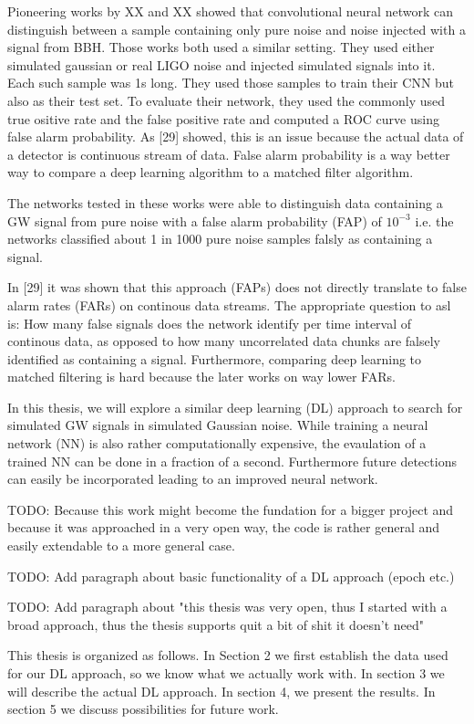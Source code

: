 Pioneering works by XX and XX showed that convolutional neural network can
distinguish between a sample containing only pure noise and noise injected
with a signal from BBH. Those works both used a similar setting. They used either
simulated gaussian or real LIGO noise and injected simulated signals into it.
Each such sample was 1s long. They used those samples to train their CNN but
also as their test set. To evaluate their network, they used the commonly used
true ositive rate and the false positive rate and computed a ROC curve using
false alarm probability. As [29] showed, this is an issue because the actual
data of a detector is continuous stream of data. False alarm probability is a
way better way to compare a deep learning algorithm to a matched filter
algorithm.

The networks tested in these works were able to distinguish
data containing a GW signal from pure noise with a false alarm probability (FAP)
of $10^{-3}$ i.e. the networks classified about 1 in 1000 pure noise samples
falsly as containing a signal.

In [29] it was shown that this approach (FAPs) does not directly translate to
false alarm rates (FARs) on continous data streams. The appropriate question to
asl is: How many false signals does the network identify per time interval of
continous data, as opposed to how many uncorrelated data chunks are falsely
identified as containing a signal. Furthermore, comparing deep learning to
matched filtering is hard because the later works on way lower FARs.


In this thesis,
we will explore a similar deep learning (DL) approach to search for simulated GW
signals in simulated Gaussian noise. While training a neural network (NN) is also
rather computationally expensive, the evaulation of a trained NN can be done in
a fraction of a second. Furthermore future detections can easily be incorporated
leading to an improved neural network.

TODO: Because this work might become the fundation for a bigger project and
because it was approached in a very open way, the code is rather general and
easily extendable to a more general case.

TODO: Add paragraph about basic functionality of a DL approach (epoch etc.)

TODO: Add paragraph about "this thesis was very open, thus I started with a
broad approach, thus the thesis supports quit a bit of shit it doesn't need"

This thesis is organized as follows. In Section 2 we first establish the data
used for our DL approach, so we know what we actually work with. In section 3 
we will describe the actual DL approach.
In section 4, we present the results. In section 5 we discuss possibilities for 
future work.

